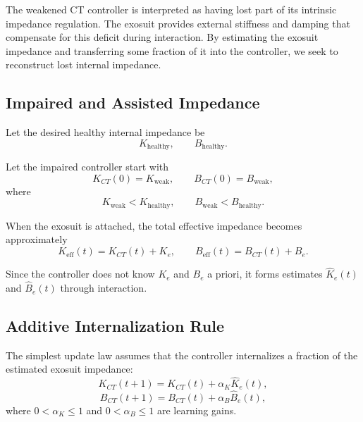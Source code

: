 \documentclass[11pt]{article}
\begin{document}
The weakened CT controller is interpreted as having lost part of its intrinsic impedance regulation. The exosuit provides external stiffness and damping that compensate for this deficit during interaction. By estimating the exosuit impedance and transferring some fraction of it into the controller, we seek to reconstruct lost internal impedance.

\subsection{Impaired and Assisted Impedance}

Let the desired healthy internal impedance be
\begin{equation}
K_{\mathrm{healthy}}, \qquad B_{\mathrm{healthy}}.
\end{equation}

Let the impaired controller start with
\begin{equation}
K_{CT}(0)=K_{\mathrm{weak}}, \qquad B_{CT}(0)=B_{\mathrm{weak}},
\end{equation}
where
\begin{equation}
K_{\mathrm{weak}} < K_{\mathrm{healthy}}, \qquad
B_{\mathrm{weak}} < B_{\mathrm{healthy}}.
\end{equation}

When the exosuit is attached, the total effective impedance becomes approximately
\begin{equation}
K_{\mathrm{eff}}(t) = K_{CT}(t) + K_e,
\qquad
B_{\mathrm{eff}}(t) = B_{CT}(t) + B_e.
\end{equation}

Since the controller does not know \(K_e\) and \(B_e\) a priori, it forms estimates \(\hat{K}_e(t)\) and \(\hat{B}_e(t)\) through interaction.

\subsection{Additive Internalization Rule}

The simplest update law assumes that the controller internalizes a fraction of the estimated exosuit impedance:
\begin{equation}
K_{CT}(t+1) = K_{CT}(t) + \alpha_K \hat{K}_e(t),
\label{eq:additive_K}
\end{equation}
\begin{equation}
B_{CT}(t+1) = B_{CT}(t) + \alpha_B \hat{B}_e(t),
\label{eq:additive_B}
\end{equation}
where \(0 < \alpha_K \leq 1\) and \(0 < \alpha_B \leq 1\) are learning gains.
\end{document}
